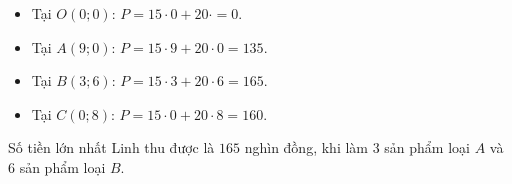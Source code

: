 \begin{ex}
{\begin{center}
		\end{center}
		\begin{itemize}
			\item Tại $ O(0;0) $: $ P = 15\cdot 0 + 20\cdot = 0$.
			\item Tại $A(9; 0) $: $ P = 15\cdot 9 + 20\cdot 0 = 135 $.
			\item Tại $B(3; 6) $: $ P = 15\cdot 3 + 20\cdot 6  = 165 $.
			\item Tại $C(0; 8) $: $ P = 15\cdot 0 + 20\cdot 8 = 160 $.
		\end{itemize}
		Số tiền lớn nhất Linh thu được là $165$ nghìn đồng, khi làm $3$ sản phẩm loại $ A $ và $6$ sản phẩm loại $ B $.
	}
\end{ex}
